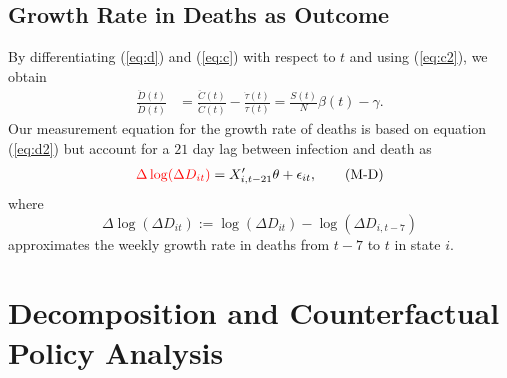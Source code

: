 \documentclass[11pt,reqno,letter]{amsart}
\theoremstyle{definition}
\def\ycolor{\color{red}}
\begin{document}
\subsection{Growth Rate in Deaths as Outcome}\label{sec:sirmodel-death}
By differentiating (\ref{eq:d}) and (\ref{eq:c}) with respect to $t$ and using (\ref{eq:c2}), we obtain
\begin{align}
\frac{\ddot{D}(t) }{\dot D(t)}& = \frac{\ddot{C}(t) }{\dot C(t)}  - \frac{\dot{\tau}(t) }{ \tau(t)}    =  \frac{S(t)}{N}\beta(t)  -   \gamma.\label{eq:d2}
\end{align}
Our measurement equation for the growth rate of deaths is based on equation (\ref{eq:d2}) but   account for a $21$ day lag between infection and death as
\begin{align}
{\ycolor \Delta \log(\Delta D_{it})}  = X_{i,t-21}' \theta + \epsilon_{it},\label{eq:M-D} \tag{M-D}
\end{align}
where
\begin{equation} \label{eq:y-d}
 \Delta \log(\Delta D_{it}):= \log( \Delta D_{it} ) -
\log( \Delta D_{i,t-7})
\end{equation}
approximates the weekly growth rate in deaths from $t-7$ to $t$ in state $i$. %


\section{Decomposition and Counterfactual Policy Analysis}
\end{document}
